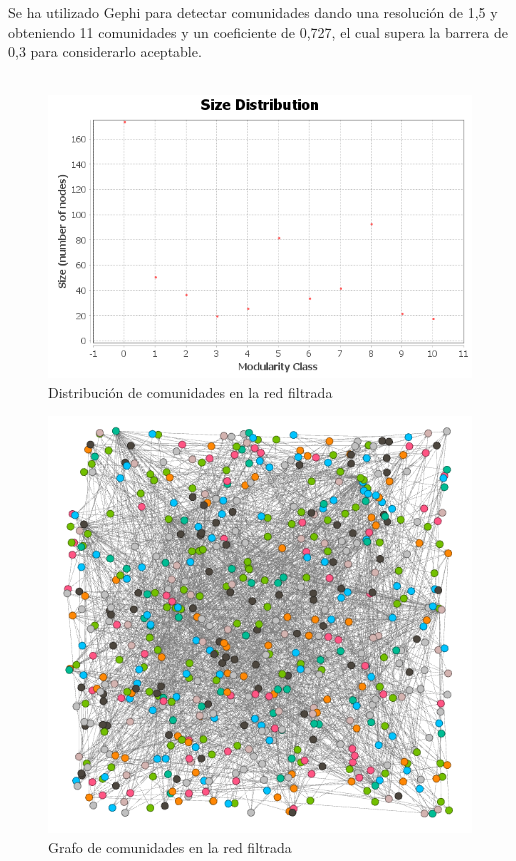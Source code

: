 Se ha utilizado Gephi para detectar comunidades dando una resolución de 1,5 y obteniendo 11 comunidades y un coeficiente de 0,727, el cual supera la barrera de 0,3 para considerarlo aceptable.
\\ \\

\begin{figure}[H]
	\centering
	\includegraphics[width=12cm]{../images/communities-size-distribution}
	\caption{Distribución de comunidades en la red filtrada}
	\label{fig:communities-size-distribution}
\end{figure}

\begin{figure}[H]
	\centering
	\includegraphics[width=12cm]{../images/modularity-class}
	\caption{Grafo de comunidades en la red filtrada}
	\label{fig:modularity-class}
\end{figure}

